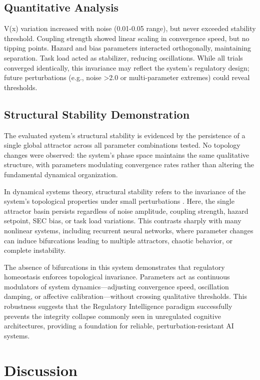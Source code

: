 \documentclass[11pt,a4paper]{article}
\begin{document}
\subsection{Quantitative Analysis}

V(x) variation increased with noise (0.01-0.05 range), but never exceeded stability threshold. Coupling strength showed linear scaling in convergence speed, but no tipping points. Hazard and bias parameters interacted orthogonally, maintaining separation. Task load acted as stabilizer, reducing oscillations. While all trials converged identically, this invariance may reflect the system's regulatory design; future perturbations (e.g., noise >2.0 or multi-parameter extremes) could reveal thresholds.

\subsection{Structural Stability Demonstration}

The evaluated system's structural stability is evidenced by the persistence of a single global attractor across all parameter combinations tested. No topology changes were observed: the system's phase space maintains the same qualitative structure, with parameters modulating convergence rates rather than altering the fundamental dynamical organization.

In dynamical systems theory, structural stability refers to the invariance of the system's topological properties under small perturbations \cite{Strogatz2018}. Here, the single attractor basin persists regardless of noise amplitude, coupling strength, hazard setpoint, SEC bias, or task load variations. This contrasts sharply with many nonlinear systems, including recurrent neural networks, where parameter changes can induce bifurcations leading to multiple attractors, chaotic behavior, or complete instability.

The absence of bifurcations in this system demonstrates that regulatory homeostasis enforces topological invariance. Parameters act as continuous modulators of system dynamics—adjusting convergence speed, oscillation damping, or affective calibration—without crossing qualitative thresholds. This robustness suggests that the Regulatory Intelligence paradigm successfully prevents the integrity collapse commonly seen in unregulated cognitive architectures, providing a foundation for reliable, perturbation-resistant AI systems.


\section{Discussion}
\end{document}
